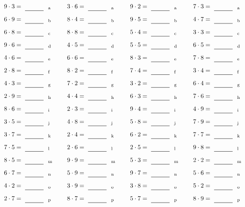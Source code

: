 \documentclass
[
  draft    = true,
  fontsize = 11pt,
  parskip  = half-
]
{scrartcl}
\begin{document}
\par\vfill\par
\begin{align*}
    \pline{9\cdot3}&=\rline{a}
  & \pline{3\cdot6}&=\rline{a}
  & \pline{9\cdot2}&=\rline{a}
  & \pline{7\cdot3}&=\rline{a} \\[1ex]
    \pline{6\cdot9}&=\rline{b}
  & \pline{8\cdot4}&=\rline{b}
  & \pline{9\cdot5}&=\rline{b}
  & \pline{4\cdot7}&=\rline{b} \\[1ex]
    \pline{6\cdot8}&=\rline{c}
  & \pline{8\cdot8}&=\rline{c}
  & \pline{5\cdot4}&=\rline{c}
  & \pline{3\cdot3}&=\rline{c} \\[1ex]
    \pline{9\cdot6}&=\rline{d}
  & \pline{4\cdot5}&=\rline{d}
  & \pline{5\cdot5}&=\rline{d}
  & \pline{6\cdot5}&=\rline{d} \\[1ex]
    \pline{4\cdot6}&=\rline{e}
  & \pline{6\cdot6}&=\rline{e}
  & \pline{8\cdot3}&=\rline{e}
  & \pline{7\cdot8}&=\rline{e} \\[1ex]
    \pline{2\cdot8}&=\rline{f}
  & \pline{8\cdot2}&=\rline{f}
  & \pline{7\cdot4}&=\rline{f}
  & \pline{3\cdot4}&=\rline{f} \\[1ex]
    \pline{4\cdot3}&=\rline{g}
  & \pline{7\cdot2}&=\rline{g}
  & \pline{3\cdot2}&=\rline{g}
  & \pline{6\cdot4}&=\rline{g} \\[1ex]
    \pline{2\cdot9}&=\rline{h}
  & \pline{4\cdot4}&=\rline{h}
  & \pline{6\cdot3}&=\rline{h}
  & \pline{7\cdot6}&=\rline{h} \\[1ex]
    \pline{8\cdot6}&=\rline{i}
  & \pline{2\cdot3}&=\rline{i}
  & \pline{9\cdot4}&=\rline{i}
  & \pline{4\cdot9}&=\rline{i} \\[1ex]
    \pline{3\cdot5}&=\rline{j}
  & \pline{4\cdot8}&=\rline{j}
  & \pline{5\cdot8}&=\rline{j}
  & \pline{7\cdot9}&=\rline{j} \\[1ex]
    \pline{3\cdot7}&=\rline{k}
  & \pline{2\cdot4}&=\rline{k}
  & \pline{6\cdot2}&=\rline{k}
  & \pline{7\cdot7}&=\rline{k} \\[1ex]
    \pline{7\cdot5}&=\rline{l}
  & \pline{2\cdot6}&=\rline{l}
  & \pline{2\cdot5}&=\rline{l}
  & \pline{9\cdot8}&=\rline{l} \\[1ex]
    \pline{8\cdot5}&=\rline{m}
  & \pline{9\cdot9}&=\rline{m}
  & \pline{5\cdot3}&=\rline{m}
  & \pline{2\cdot2}&=\rline{m} \\[1ex]
    \pline{6\cdot7}&=\rline{n}
  & \pline{5\cdot9}&=\rline{n}
  & \pline{9\cdot7}&=\rline{n}
  & \pline{5\cdot6}&=\rline{n} \\[1ex]
    \pline{4\cdot2}&=\rline{o}
  & \pline{3\cdot9}&=\rline{o}
  & \pline{3\cdot8}&=\rline{o}
  & \pline{5\cdot2}&=\rline{o} \\[1ex]
    \pline{2\cdot7}&=\rline{p}
  & \pline{8\cdot7}&=\rline{p}
  & \pline{5\cdot7}&=\rline{p}
  & \pline{8\cdot9}&=\rline{p}
\end{align*}
\end{document}
